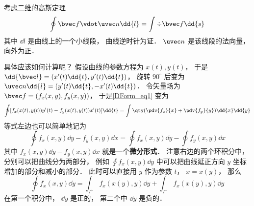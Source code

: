 
\begin{issues}
\issueDraft
\end{issues}


考虑二维的高斯定理
\begin{equation}\label{DForm_eq1}
\oint \bvec f \vdot \uvec n \dd{l} = \int \div \bvec f \dd{s}
\end{equation}
其中 $\dd{l}$ 是曲线上的一个小线段， 曲线逆时针为证． $\uvec n$ 是该线段的法向量， 向外为正．

具体应该如何计算呢？ 假设曲线的参数方程为 $x(t), y(t)$， 于是 $\dd{\bvec l} = (x'(t)\dd{t}, y'(t)\dd{t})$， 旋转 $90^\circ$ 后变为 $\uvec n \dd{l} = (y'(t)\dd{t}, -x'(t)\dd{t})$． 令矢量场为 $\bvec f = (f_x(x,y), f_y(x,y))$， 于是\autoref{DForm_eq1} 变为
\begin{equation}
\oint [f_x(x(t),y(t)) y'(t) - f_y(x(t),y(t)) x'(t)]\dd{t}
= \int \qty(\pdv{f_x}{x} + \pdv{f_y}{y}) \dd{x}\dd{y}
\end{equation}
等式左边也可以简单地记为
\begin{equation}
\oint f_x(x,y) \dd{y} - f_y(x,y) \dd{x} = \oint f_x(x,y) \dd{y} - \oint f_y(x,y) \dd{x}
\end{equation}
其中 $f_x(x,y) \dd{y} - f_y(x,y) \dd{x}$ 就是一个\textbf{微分形式}． 注意右边的两个环积分中， 分别可以把曲线分为两部分， 例如 $\oint f_x(x,y) \dd{y}$ 中可以把曲线延正方向 $y$ 坐标增加的部分和减小的部分． 此时可以直接用 $y$ 作为参数 $t$， $x = x(y)$， 那么
\begin{equation}
\oint f_x(x,y) \dd{y} = \int_{I^+} f_x(x(y),y) \dd{y} + \int_{I^-} f_x(x(y),y) \dd{y}
\end{equation}
在第一个积分中， $\dd{y}$ 是正的， 第二个中 $\dd{y}$ 是负的．

